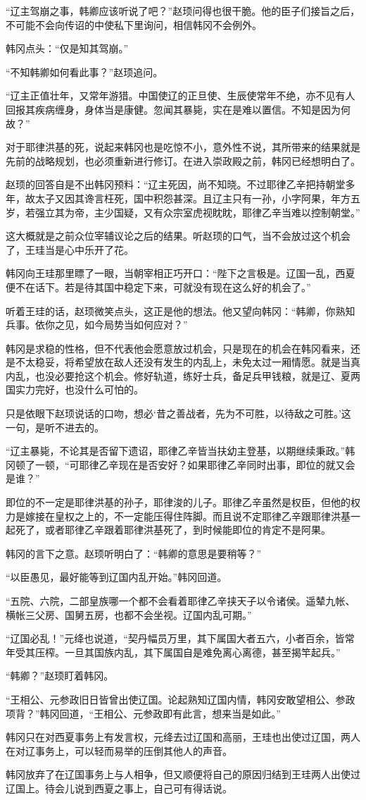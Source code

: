 “辽主驾崩之事，韩卿应该听说了吧？”赵顼问得也很干脆。他的臣子们接旨之后，不可能不会向传诏的中使私下里询问，相信韩冈不会例外。

韩冈点头：“仅是知其驾崩。”

“不知韩卿如何看此事？”赵顼追问。

“辽主正值壮年，又常年游猎。中国使辽的正旦使、生辰使常年不绝，亦不见有人回报其疾病缠身，身体当是康健。忽闻其暴毙，实在是难以置信。不知是因为何故？”

对于耶律洪基的死，说起来韩冈也是吃惊不小，意外性不说，其所带来的结果就是先前的战略规划，也必须重新进行修订。在进入崇政殿之前，韩冈已经想明白了。

赵顼的回答自是不出韩冈预料：“辽主死因，尚不知晓。不过耶律乙辛把持朝堂多年，故太子又因其谗言枉死，国中积怨甚深。且辽主只有一孙，小字阿果，年方五岁，若强立其为帝，主少国疑，又有众宗室虎视眈眈，耶律乙辛当难以控制朝堂。”

这大概就是之前众位宰辅议论之后的结果。听赵顼的口气，当不会放过这个机会了，王珪当是心中乐开了花。

韩冈向王珪那里瞟了一眼，当朝宰相正巧开口：“陛下之言极是。辽国一乱，西夏便不在话下。若是待其国中稳定下来，可就没有现在这么好的机会了。”

听着王珪的话，赵顼微笑点头，这正是他的想法。他又望向韩冈：“韩卿，你熟知兵事。依你之见，如今局势当如何应对？”

韩冈是求稳的性格，但不代表他会愿意放过机会，只是现在的机会在韩冈看来，还是不太稳妥，将希望放在敌人还没有发生的内乱上，未免太过一厢情愿。就是当真内乱，也没必要抢这个机会。修好轨道，练好士兵，备足兵甲钱粮，就是辽、夏两国实力完好，也没什么可怕的。

只是依眼下赵顼说话的口吻，想必‘昔之善战者，先为不可胜，以待敌之可胜。’这一句，是听不进去的。

“辽主暴毙，不论其是否留下遗诏，耶律乙辛皆当扶幼主登基，以期继续秉政。”韩冈顿了一顿，“可耶律乙辛现在是否安好？如果耶律乙辛同时出事，即位的就又会是谁？”

即位的不一定是耶律洪基的孙子，耶律浚的儿子。耶律乙辛虽然是权臣，但他的权力是嫁接在皇权之上的，不一定能压得住阵脚。而且说不定耶律乙辛跟耶律洪基一起死了，或者耶律乙辛跟着耶律洪基死了，到时候能即位的肯定不是阿果。

韩冈的言下之意。赵顼听明白了：“韩卿的意思是要稍等？”

“以臣愚见，最好能等到辽国内乱开始。”韩冈回道。

“五院、六院，二部皇族哪一个都不会看着耶律乙辛挟天子以令诸侯。遥辇九帐、横帐三父房、国舅五房，也都不会坐视。辽国内乱可期。”

“辽国必乱！”元绛也说道，“契丹幅员万里，其下属国大者五六，小者百余，皆常年受其压榨。一旦其国族内乱，其下属国自是难免离心离德，甚至揭竿起兵。”

“韩卿？”赵顼盯着韩冈。

“王相公、元参政旧日皆曾出使辽国。论起熟知辽国内情，韩冈安敢望相公、参政项背？”韩冈回道，“王相公、元参政即有此言，想来当是如此。”

韩冈只在对西夏事务上有发言权，元绛去过辽国和高丽，王珪也出使过辽国，两人在对辽事务上，可以轻而易举的压倒其他人的声音。

韩冈放弃了在辽国事务上与人相争，但又顺便将自己的原因归结到王珪两人出使过辽国上。待会儿说到西夏之事上，自己可有得话说。


